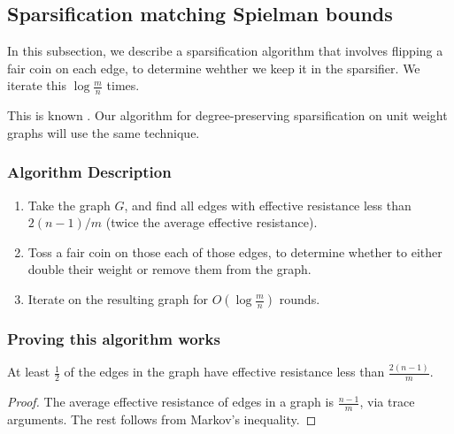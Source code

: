 \documentclass[12pt]{article}
\begin{document}
\subsection{Sparsification matching Spielman bounds}
In this subsection, we describe a sparsification algorithm that involves flipping a fair coin on each edge, to determine wehther we keep it in the sparsifier. We iterate this $\log \frac{m}{n}$ times.

This is known . Our algorithm for degree-preserving sparsification on unit weight graphs will use the same technique.

\subsubsection{Algorithm Description} \label{subsubsection:alg-desc}
\begin{enumerate} 
\item Take the graph $G$, and find all edges with effective resistance less than $2(n-1)/m$ (twice the average effective resistance).
\item Toss a fair coin on those each of those edges, to determine whether to either double
  their weight or remove them from the graph.
\item Iterate on the resulting graph for $O(\log \frac{m}{n})$ rounds.
\end{enumerate}
\subsubsection{Proving this algorithm works}
\begin{lemma} \label{lem:edge-keeps}
At least $\frac{1}{2}$ of the edges in the graph have effective resistance less than $\frac{2(n-1)}{m}$. \end{lemma}

\begin{proof} The average effective resistance of edges in a graph is $\frac{n-1}{m}$, via trace arguments. The rest follows from Markov's inequality. \end{proof}
\end{document}
